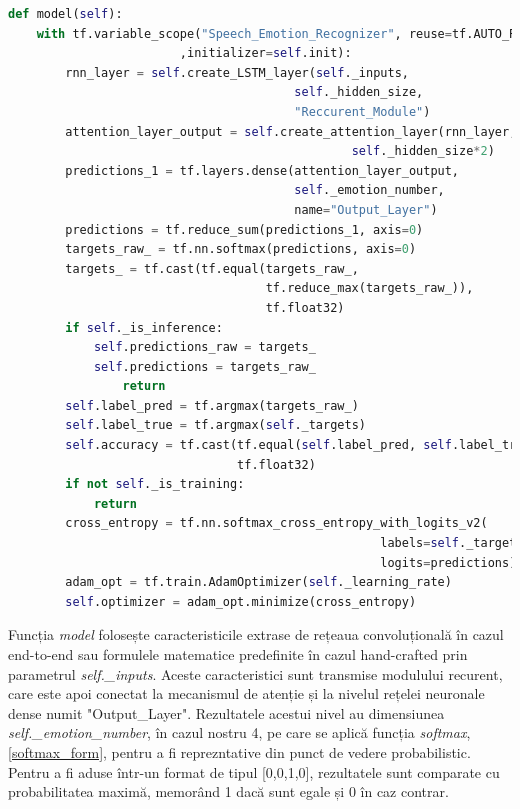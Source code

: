 \documentclass[a4paper,12pt]{book}
\begin{document}
		\begin{lstlisting}[language=Python, caption={Funcția care crează graficul de execuție Tensorflow, conectând toate componentele de procesare ale sistemului SER.}]	
def model(self):
	with tf.variable_scope("Speech_Emotion_Recognizer", reuse=tf.AUTO_REUSE
						,initializer=self.init):
		rnn_layer = self.create_LSTM_layer(self._inputs, 
										self._hidden_size, 
										"Reccurent_Module")		
		attention_layer_output = self.create_attention_layer(rnn_layer, 
												self._hidden_size*2)
		predictions_1 = tf.layers.dense(attention_layer_output, 
										self._emotion_number, 
										name="Output_Layer")
		predictions = tf.reduce_sum(predictions_1, axis=0)		
		targets_raw_ = tf.nn.softmax(predictions, axis=0)		
		targets_ = tf.cast(tf.equal(targets_raw_, 
									tf.reduce_max(targets_raw_)), 
									tf.float32)
		if self._is_inference:
			self.predictions_raw = targets_
			self.predictions = targets_raw_
				return					
		self.label_pred = tf.argmax(targets_raw_)
		self.label_true = tf.argmax(self._targets)		
		self.accuracy = tf.cast(tf.equal(self.label_pred, self.label_true),
								tf.float32)
		if not self._is_training:
			return
		cross_entropy = tf.nn.softmax_cross_entropy_with_logits_v2(
													labels=self._targets, 
													logits=predictions)	
		adam_opt = tf.train.AdamOptimizer(self._learning_rate)
		self.optimizer = adam_opt.minimize(cross_entropy)	\end{lstlisting}
		Funcția \textit{model} folosește caracteristicile extrase de rețeaua convoluțională în cazul end-to-end sau formulele matematice predefinite în cazul hand-crafted prin parametrul \textit{self.\_inputs}. Aceste caracteristici sunt transmise modulului recurent, care este apoi conectat la mecanismul de atenție și la nivelul rețelei neuronale dense numit "Output\_Layer". Rezultatele acestui nivel au dimensiunea \textit{self.\_emotion\_number}, în cazul nostru 4, pe care se aplică funcția \textit{softmax}, \ref{softmax_form}, pentru a fi reprezntative din punct de vedere probabilistic. Pentru a fi aduse într-un format de tipul [0,0,1,0], rezultatele sunt comparate cu probabilitatea maximă, memorând 1 dacă sunt egale și 0 în caz contrar. \par
		
\end{document}
